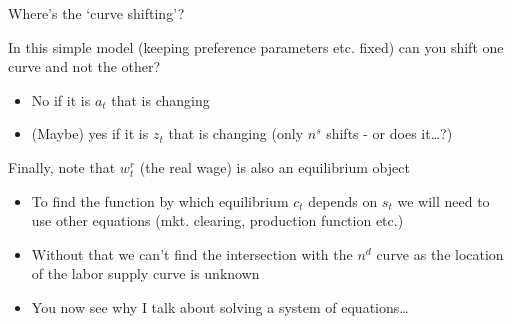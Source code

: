 

\begin{frame}[label=curveshift]{Where's the `curve shifting'?}

In this simple model (keeping preference parameters etc. fixed) can you shift one curve and not the other?
\begin{itemize}
\item	No if it is $a_{t}$ that is changing
\item	(Maybe) yes if it is $z_{t}$ that is changing (only $n^{s}$ shifts - or does it\ldots?)
\end{itemize}

\vspace{2mm}
Finally, note that $w^{r}_{t}$ (the real wage) is also an equilibrium object
\begin{itemize}
\item	To find the function by which equilibrium $c_{t}$ depends on $s_{t}$ we will need to use other equations (mkt. clearing, production function etc.)
\item	Without that we can't find the intersection with the $n^{d}$ curve as the location of the labor supply curve is unknown
\item	You now see why I talk about solving a system of equations\ldots
\end{itemize}

\vspace{2mm}
\hyperlink{bachmann}{}

\end{frame}



